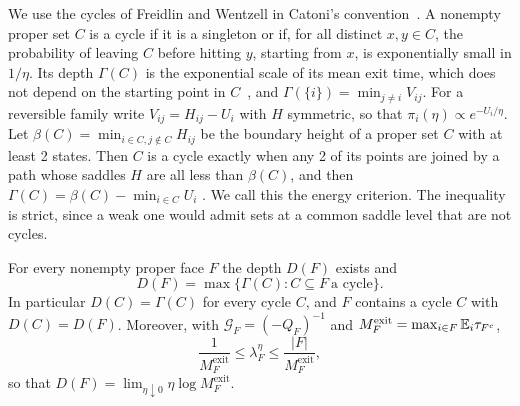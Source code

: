We use the cycles of Freidlin and Wentzell in Catoni's
convention~\cite[Definition~4.2]{catoni1999}. A nonempty
proper set $C$ is a cycle if it is a singleton or if, for all distinct
$x,y\in C$, the probability of leaving $C$ before hitting $y$, starting from
$x$, is exponentially small in $1/\eta$. Its depth $\Gamma(C)$ is the
exponential scale of its mean exit time, which does not depend on the
starting point in $C$~\cite[Proposition~4.6]{catoni1999}, and
$\Gamma(\{i\})=\min_{j\ne i}V_{ij}$.
For a reversible family write $V_{ij}=H_{ij}-U_i$ with $H$ symmetric, so that
$\pi_i(\eta)\propto e^{-U_i/\eta}$. Let $\beta(C)=\min_{i\in C,j\notin C}H_{ij}$ be the
boundary height of a proper set $C$ with at least 2 states. Then $C$ is a cycle exactly
when any 2 of its points are joined by a path whose saddles $H$ are all less than $\beta(C)$,
and then $\Gamma(C)=\beta(C)-\min_{i\in C}U_i$
\cite[Definition~3.5, Propositions~3.10 and~3.15]{cirillonardisohier2015}.
We call this the energy criterion. The inequality is strict, since a weak one
would admit sets at a common saddle level that are not cycles.

\begin{theorem}\label{thm:depth}
For every nonempty proper face $F$ the depth $D(F)$ exists and
\[
 D(F)=\max\{\Gamma(C):C\subseteq F\ \text{a cycle}\}.
\]
In particular $D(C)=\Gamma(C)$ for every cycle $C$, and $F$ contains a cycle
$C$ with $D(C)=D(F)$. Moreover, with $\mathcal G_F=(-Q_F)^{-1}$ and
$M^{\mathrm{exit}}_F=\max_{i\in F}\mathbb{E}_i\tau_{F^c}$,
\[
 \frac1{M^{\mathrm{exit}}_F}\le \lambda^\eta_F\le\frac{|F|}{M^{\mathrm{exit}}_F},
\]
so that $D(F)=\lim_{\eta\downarrow0}\eta\log M^{\mathrm{exit}}_F$.
\end{theorem}

